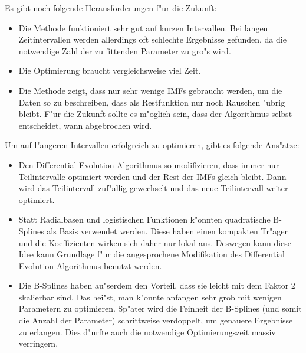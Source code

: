 \documentclass[a4paper]{scrartcl}
\begin{document}
Es gibt noch folgende Herausforderungen f"ur die Zukunft:
\begin{itemize}
\item Die Methode funktioniert sehr gut auf kurzen Intervallen. 
Bei langen Zeitintervallen werden allerdings oft schlechte Ergebnisse gefunden, da die notwendige Zahl der zu fittenden Parameter zu gro"s wird. 
\item Die Optimierung braucht vergleichsweise viel Zeit.
\item Die Methode zeigt, dass nur sehr wenige IMFs gebraucht werden, um die Daten so zu beschreiben, dass als Restfunktion nur noch Rauschen "ubrig bleibt. 
F"ur die Zukunft sollte es m"oglich sein, dass der Algorithmus selbst entscheidet, wann abgebrochen wird. 
\end{itemize}
Um auf l"angeren Intervallen erfolgreich zu optimieren, gibt es folgende Ans"atze:
\begin{itemize}
\item Den Differential Evolution Algorithmus so modifizieren, dass immer nur Teilintervalle optimiert werden und der Rest der IMFs gleich bleibt. 
  Dann wird das Teilintervall zuf"allig gewechselt und das neue Teilintervall weiter optimiert. 
\item Statt Radialbasen und logistischen Funktionen k"onnten quadratische B-Splines als Basis verwendet werden. 
  Diese haben einen kompakten Tr"ager und die Koeffizienten wirken sich daher nur lokal aus. 
  Deswegen kann diese Idee kann Grundlage f"ur die angesprochene Modifikation des Differential Evolution Algorithmus benutzt werden. 
\item Die B-Splines haben au"serdem den Vorteil, dass sie leicht mit dem Faktor 2 skalierbar sind. 
  Das hei"st, man k"onnte anfangen sehr grob mit wenigen Parametern zu optimieren. 
  Sp"ater wird die Feinheit der B-Splines (und somit die Anzahl der Parameter) schrittweise verdoppelt, um genauere Ergebnisse zu erlangen. 
  Dies d"urfte auch die notwendige Optimierungszeit massiv verringern. 
\end{itemize}




%





\end{document}
